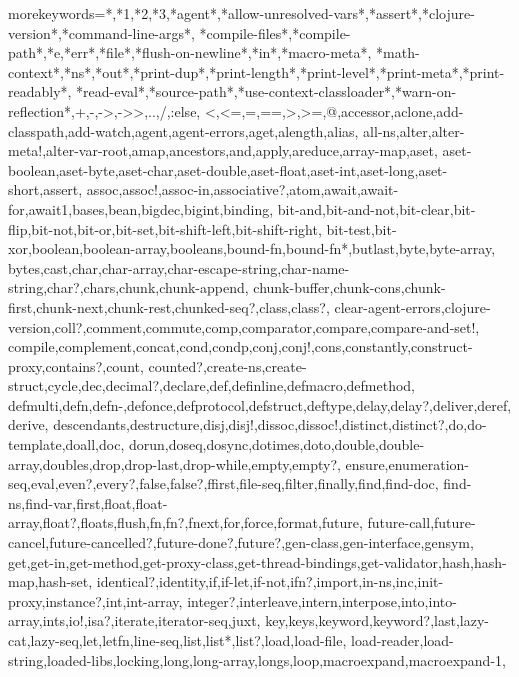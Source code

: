 
%
{morekeywords={*,*1,*2,*3,*agent*,*allow-unresolved-vars*,*assert*,*clojure-version*,*command-line-args*,%
*compile-files*,*compile-path*,*e,*err*,*file*,*flush-on-newline*,*in*,*macro-meta*,%
*math-context*,*ns*,*out*,*print-dup*,*print-length*,*print-level*,*print-meta*,*print-readably*,%
*read-eval*,*source-path*,*use-context-classloader*,*warn-on-reflection*,+,-,->,->>,..,/,:else,%
<,<=,=,==,>,>=,@,accessor,aclone,add-classpath,add-watch,agent,agent-errors,aget,alength,alias,%
all-ns,alter,alter-meta!,alter-var-root,amap,ancestors,and,apply,areduce,array-map,aset,%
aset-boolean,aset-byte,aset-char,aset-double,aset-float,aset-int,aset-long,aset-short,assert,%
assoc,assoc!,assoc-in,associative?,atom,await,await-for,await1,bases,bean,bigdec,bigint,binding,%
bit-and,bit-and-not,bit-clear,bit-flip,bit-not,bit-or,bit-set,bit-shift-left,bit-shift-right,%
bit-test,bit-xor,boolean,boolean-array,booleans,bound-fn,bound-fn*,butlast,byte,byte-array,%
bytes,cast,char,char-array,char-escape-string,char-name-string,char?,chars,chunk,chunk-append,%
chunk-buffer,chunk-cons,chunk-first,chunk-next,chunk-rest,chunked-seq?,class,class?,%
clear-agent-errors,clojure-version,coll?,comment,commute,comp,comparator,compare,compare-and-set!,%
compile,complement,concat,cond,condp,conj,conj!,cons,constantly,construct-proxy,contains?,count,%
counted?,create-ns,create-struct,cycle,dec,decimal?,declare,def,definline,defmacro,defmethod,%
defmulti,defn,defn-,defonce,defprotocol,defstruct,deftype,delay,delay?,deliver,deref,derive,%
descendants,destructure,disj,disj!,dissoc,dissoc!,distinct,distinct?,do,do-template,doall,doc,%
dorun,doseq,dosync,dotimes,doto,double,double-array,doubles,drop,drop-last,drop-while,empty,empty?,%
ensure,enumeration-seq,eval,even?,every?,false,false?,ffirst,file-seq,filter,finally,find,find-doc,%
find-ns,find-var,first,float,float-array,float?,floats,flush,fn,fn?,fnext,for,force,format,future,%
future-call,future-cancel,future-cancelled?,future-done?,future?,gen-class,gen-interface,gensym,%
get,get-in,get-method,get-proxy-class,get-thread-bindings,get-validator,hash,hash-map,hash-set,%
identical?,identity,if,if-let,if-not,ifn?,import,in-ns,inc,init-proxy,instance?,int,int-array,%
integer?,interleave,intern,interpose,into,into-array,ints,io!,isa?,iterate,iterator-seq,juxt,%
key,keys,keyword,keyword?,last,lazy-cat,lazy-seq,let,letfn,line-seq,list,list*,list?,load,load-file,%
load-reader,load-string,loaded-libs,locking,long,long-array,longs,loop,macroexpand,macroexpand-1,%
}}
